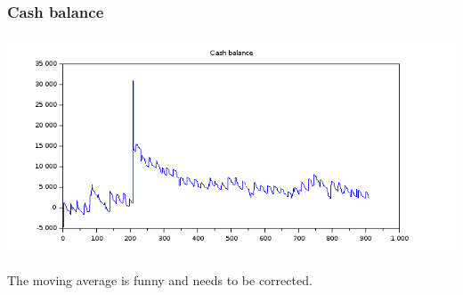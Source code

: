 \documentclass[8pt]{article} %
\begin{document}
\subsubsection{Cash balance}
\includegraphics[scale=0.6]{Scilab-cashBalance.png}

The moving average is funny and needs to be corrected.\\
%
%
%


%
%

%
%

%
%

%
%
\end{document}
